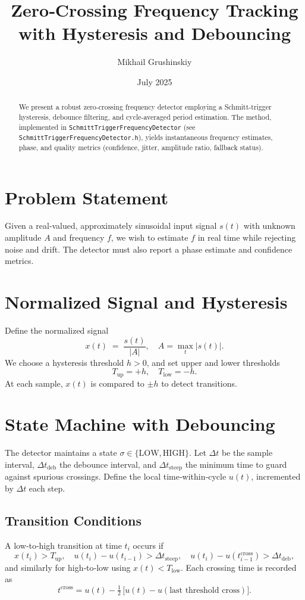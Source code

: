 \documentclass[12pt,letterpaper]{article}
\begin{document}
\title{Zero‐Crossing Frequency Tracking with Hysteresis and Debouncing}
\author{Mikhail Grushinskiy}
\date{July 2025}
\maketitle

\begin{abstract}
We present a robust zero‐crossing frequency detector employing a Schmitt‐trigger hysteresis, debounce filtering, and cycle‐averaged period estimation.  The method, implemented in \texttt{SchmittTriggerFrequencyDetector} (see \texttt{SchmittTriggerFrequencyDetector.h}), yields instantaneous frequency estimates, phase, and quality metrics (confidence, jitter, amplitude ratio, fallback status).
\end{abstract}

\section{Problem Statement}
Given a real‐valued, approximately sinusoidal input signal \(s(t)\) with unknown amplitude \(A\) and frequency \(f\), we wish to estimate \(f\) in real time while rejecting noise and drift.  The detector must also report a phase estimate and confidence metrics.

\section{Normalized Signal and Hysteresis}
Define the normalized signal
\[
x(t) \;=\; \frac{s(t)}{\lvert A\rvert}, 
\quad A = \max_t |s(t)|.
\]
We choose a hysteresis threshold \(h>0\), and set upper and lower thresholds
\[
T_{\mathrm{up}} = +h,\quad T_{\mathrm{low}} = -h.
\]
At each sample, \(x(t)\) is compared to \(\pm h\) to detect transitions.

\section{State Machine with Debouncing}
The detector maintains a state \(\sigma \in \{\mathrm{LOW}, \mathrm{HIGH}\}\).  Let \(\Delta t\) be the sample interval, \(\Delta t_{\mathrm{deb}}\) the debounce interval, and \(\Delta t_{\mathrm{steep}}\) the minimum time to guard against spurious crossings.  Define the local time‐within‐cycle \(u(t)\), incremented by \(\Delta t\) each step.

\subsection{Transition Conditions}
A low‐to‐high transition at time \(t_i\) occurs if
\[
x(t_i) > T_{\mathrm{up}}, 
\quad u(t_i) - u(t_{i-1}) > \Delta t_{\mathrm{steep}}, 
\quad u(t_i) - u(t_{i-1}^{\mathrm{cross}}) > \Delta t_{\mathrm{deb}},
\]
and similarly for high‐to‐low using \(x(t) < T_{\mathrm{low}}\).  Each crossing time is recorded as
\[
t^{\mathrm{cross}} = u(t) - \tfrac12\,\bigl[u(t)-u(\text{last threshold cross})\bigr].
\]
\end{document}
